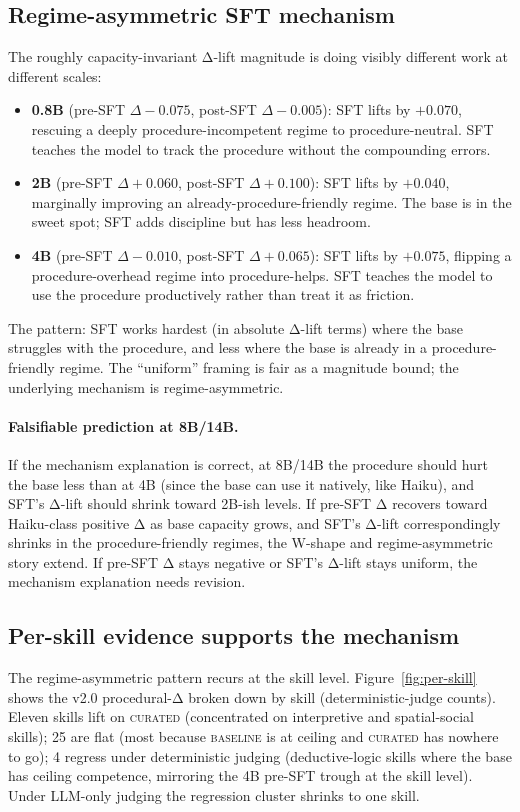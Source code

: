 \documentclass[10pt]{article}
\newcommand{\BL}{\textsc{baseline}\xspace}
\newcommand{\CU}{\textsc{curated}\xspace}
\begin{document}
\subsection{Regime-asymmetric SFT mechanism}\label{sec:mechanism}
The roughly capacity-invariant Δ-lift magnitude is doing visibly different work at different scales:
\begin{itemize}[leftmargin=*, nosep]
  \item \textbf{0.8B} (pre-SFT $\Delta -0.075$, post-SFT $\Delta -0.005$): SFT lifts by $+0.070$, rescuing a deeply procedure-incompetent regime to procedure-neutral. SFT teaches the model to track the procedure without the compounding errors.
  \item \textbf{2B} (pre-SFT $\Delta +0.060$, post-SFT $\Delta +0.100$): SFT lifts by $+0.040$, marginally improving an already-procedure-friendly regime. The base is in the sweet spot; SFT adds discipline but has less headroom.
  \item \textbf{4B} (pre-SFT $\Delta -0.010$, post-SFT $\Delta +0.065$): SFT lifts by $+0.075$, flipping a procedure-overhead regime into procedure-helps. SFT teaches the model to use the procedure productively rather than treat it as friction.
\end{itemize}
The pattern: SFT works hardest (in absolute Δ-lift terms) where the base struggles with the procedure, and less where the base is already in a procedure-friendly regime. The ``uniform'' framing is fair as a magnitude bound; the underlying mechanism is regime-asymmetric.

\paragraph{Falsifiable prediction at 8B/14B.} If the mechanism explanation is correct, at 8B/14B the procedure should hurt the base less than at 4B (since the base can use it natively, like Haiku), and SFT's Δ-lift should shrink toward 2B-ish levels. If pre-SFT Δ recovers toward Haiku-class positive Δ as base capacity grows, and SFT's Δ-lift correspondingly shrinks in the procedure-friendly regimes, the W-shape and regime-asymmetric story extend. If pre-SFT Δ stays negative or SFT's Δ-lift stays uniform, the mechanism explanation needs revision.

\subsection{Per-skill evidence supports the mechanism}\label{sec:per-skill}
The regime-asymmetric pattern recurs at the skill level. Figure~\ref{fig:per-skill} shows the v2.0 procedural-Δ broken down by skill (deterministic-judge counts). Eleven skills lift on \CU{} (concentrated on interpretive and spatial-social skills); 25 are flat (most because \BL{} is at ceiling and \CU{} has nowhere to go); 4 regress under deterministic judging (deductive-logic skills where the base has ceiling competence, mirroring the 4B pre-SFT trough at the skill level). Under LLM-only judging the regression cluster shrinks to one skill.
\end{document}
